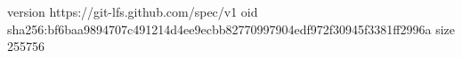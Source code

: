 version https://git-lfs.github.com/spec/v1
oid sha256:bf6baa9894707c491214d4ee9ecbb82770997904edf972f30945f3381ff2996a
size 255756
